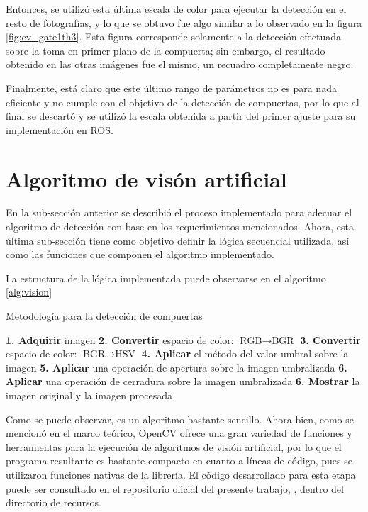 Entonces, se utilizó esta última escala de color para ejecutar la detección en el resto de fotografías, y lo que se obtuvo fue algo similar a lo observado en la figura \ref{fig:cv_gate1th3}. Esta figura corresponde solamente a la detección efectuada sobre la toma en primer plano de la compuerta; sin embargo, el resultado obtenido en las otras imágenes fue el mismo, un recuadro completamente negro.

Finalmente, está claro que este último rango de parámetros no es para nada eficiente y no cumple con el objetivo de la detección de compuertas, por lo que al final se descartó y se utilizó la escala obtenida a partir del primer ajuste para su implementación en ROS.



\section{Algoritmo de visón artificial}

En la sub-sección anterior se describió el proceso implementado para adecuar el algoritmo de detección con base en los requerimientos mencionados. Ahora, esta última sub-sección tiene como objetivo definir la lógica secuencial utilizada, así como las funciones que componen el algoritmo implementado.

La estructura de la lógica implementada puede observarse en el algoritmo \ref{alg:vision}
\begin{algorithm}
\caption{Metodología para la detección de compuertas}\label{alg:vision}
\begin{algorithmic}
\State \textbf{1. Adquirir} imagen
\State \textbf{2. Convertir }espacio de color: $\text{RGB} \to \text{BGR}$
\State \textbf{3. Convertir }espacio de color: $\text{BGR} \to \text{HSV}$
\State \textbf{4. Aplicar }el método del valor umbral sobre la imagen
\State \textbf{5. Aplicar }una operación de apertura sobre la imagen umbralizada
\State \textbf{6. Aplicar }una operación de cerradura sobre la imagen umbralizada
\State \textbf{6. Mostrar } la imagen original y la imagen procesada
\end{algorithmic}
\end{algorithm}

Como se puede observar, es un algoritmo bastante sencillo. Ahora bien, como se mencionó en el marco teórico, OpenCV ofrece una gran variedad de funciones y herramientas para la ejecución de algoritmos de visión artificial, por lo que el programa resultante es bastante compacto en cuanto a líneas de código, pues se utilizaron funciones nativas de la librería. El código desarrollado para esta etapa puede ser consultado en el repositorio oficial del presente trabajo, \citet{Axolotl}, dentro del directorio de recursos.

